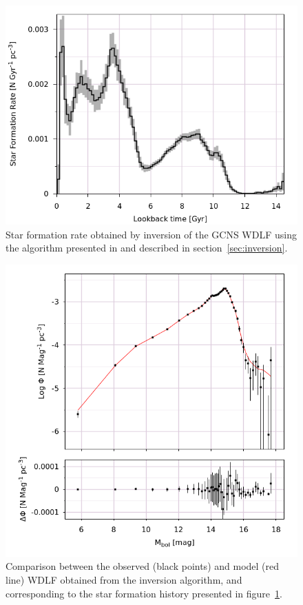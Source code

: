\documentclass[fleqn,usenatbib]{mnras}
\begin{document}
\begin{figure}
    \includegraphics[width=\columnwidth]{figures/nr_sfr_bootstrap.png}
    \caption{Star formation rate obtained by inversion of the GCNS WDLF using the
    algorithm presented in \citet{2013MNRAS.434.1549R} and described in 
    section~\ref{sec:inversion}.}
    \label{fig:nr_sfr}
\end{figure}

\begin{figure}
    \includegraphics[width=\columnwidth]{figures/nr_wdlf_bootstrap.png}
    \caption{Comparison between the observed (black points) and model (red line)
    WDLF obtained from the inversion algorithm, and corresponding to the star
    formation history presented in figure~\ref{fig:nr_sfr}.}
    \label{fig:nr_wdlf}
\end{figure}
\end{document}
